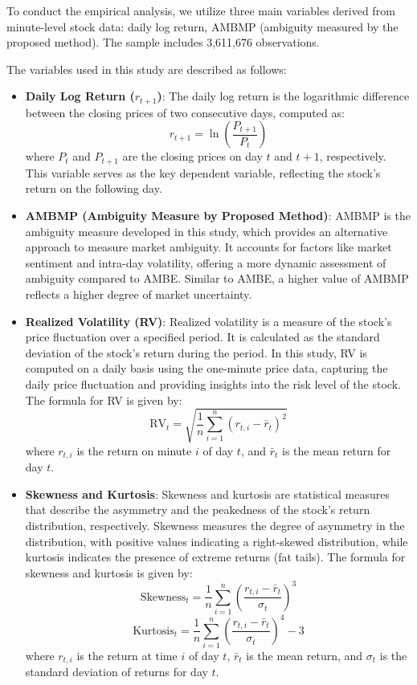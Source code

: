 \documentclass[preprint,12pt,authoryear]{elsarticle}
\begin{document}
To conduct the empirical analysis, we utilize three main variables derived from minute-level stock data: daily log return, AMBMP (ambiguity measured by the proposed method). The sample includes 3,611,676 observations.

The variables used in this study are described as follows:

\begin{itemize}
    \item \textbf{Daily Log Return ($r_{t+1}$)}: The daily log return is the logarithmic difference between the closing prices of two consecutive days, computed as:
    \[
    r_{t+1} = \ln\left(\frac{P_{t+1}}{P_t}\right)
    \]
    where $P_t$ and $P_{t+1}$ are the closing prices on day $t$ and $t+1$, respectively. This variable serves as the key dependent variable, reflecting the stock's return on the following day.
    
    \item \textbf{AMBMP (Ambiguity Measure by Proposed Method)}: AMBMP is the ambiguity measure developed in this study, which provides an alternative approach to measure market ambiguity. It accounts for factors like market sentiment and intra-day volatility, offering a more dynamic assessment of ambiguity compared to AMBE. Similar to AMBE, a higher value of AMBMP reflects a higher degree of market uncertainty.
    
    \item \textbf{Realized Volatility (RV)}: Realized volatility is a measure of the stock's price fluctuation over a specified period. It is calculated as the standard deviation of the stock's return during the period. In this study, RV is computed on a daily basis using the one-minute price data, capturing the daily price fluctuation and providing insights into the risk level of the stock. The formula for RV is given by:
    \[
    \mathrm{RV}_t = \sqrt{\frac{1}{n} \sum_{i=1}^{n} (r_{t,i} - \bar{r}_t)^2}
    \]
    where $r_{t,i}$ is the return on minute $i$ of day $t$, and $\bar{r}_t$ is the mean return for day $t$.

    \item \textbf{Skewness and Kurtosis}: Skewness and kurtosis are statistical measures that describe the asymmetry and the peakedness of the stock's return distribution, respectively. Skewness measures the degree of asymmetry in the distribution, with positive values indicating a right-skewed distribution, while kurtosis indicates the presence of extreme returns (fat tails). The formula for skewness and kurtosis is given by:
    \[
    \text{Skewness}_t = \frac{1}{n} \sum_{i=1}^{n} \left( \frac{r_{t,i} - \bar{r}_t}{\sigma_t} \right)^3
    \]
    \[
    \text{Kurtosis}_t = \frac{1}{n} \sum_{i=1}^{n} \left( \frac{r_{t,i} - \bar{r}_t}{\sigma_t} \right)^4 - 3
    \]
    where $r_{t,i}$ is the return at time $i$ of day $t$, $\bar{r}_t$ is the mean return, and $\sigma_t$ is the standard deviation of returns for day $t$.


\end{itemize}
\end{document}
